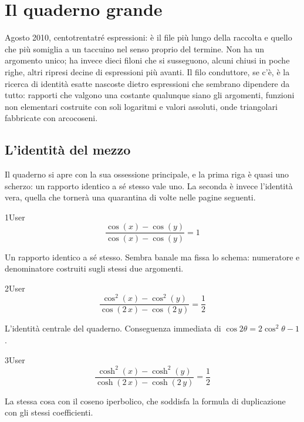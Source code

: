 \chapter{Il quaderno grande}
\label{cap:mate}

Agosto 2010, centotrentatré espressioni: è il file più lungo della raccolta e quello che più somiglia a un taccuino nel senso proprio del termine. Non ha un argomento unico; ha invece dieci filoni che si susseguono, alcuni chiusi in poche righe, altri ripresi decine di espressioni più avanti. Il filo conduttore, se c'è, è la ricerca di identità esatte nascoste dietro espressioni che sembrano dipendere da tutto: rapporti che valgono una costante qualunque siano gli argomenti, funzioni non elementari costruite con soli logaritmi e valori assoluti, onde triangolari fabbricate con arcocoseni.

\section{L'identità del mezzo}

Il quaderno si apre con la sua ossessione principale, e la prima riga è quasi uno scherzo: un rapporto identico a sé stesso vale uno. La seconda è invece l'identità vera, quella che tornerà una quarantina di volte nelle pagine seguenti.

\begin{espr}{1}{User}{\verificata}
\[
\frac{\cos\!\left(x\right) - \cos\!\left(y\right)}{\cos\!\left(x\right) - \cos\!\left(y\right)} = 1
\]
\end{espr}
Un rapporto identico a sé stesso. Sembra banale ma fissa lo schema: numeratore e denominatore costruiti sugli stessi due argomenti.

\begin{espr}{2}{User}{\verificata}
\[
\frac{\cos^{2}\!\left(x\right) - \cos^{2}\!\left(y\right)}{\cos\!\left(2\, x\right) - \cos\!\left(2\, y\right)} = \frac{1}{2}
\]
\end{espr}
L'identità centrale del quaderno. Conseguenza immediata di $\cos2\theta=2\cos^2\theta-1$.

\begin{espr}{3}{User}{\verificata}
\[
\frac{\cosh^{2}\!\left(x\right) - \cosh^{2}\!\left(y\right)}{\cosh\!\left(2\, x\right) - \cosh\!\left(2\, y\right)} = \frac{1}{2}
\]
\end{espr}
La stessa cosa con il coseno iperbolico, che soddisfa la formula di duplicazione con gli stessi coefficienti.

